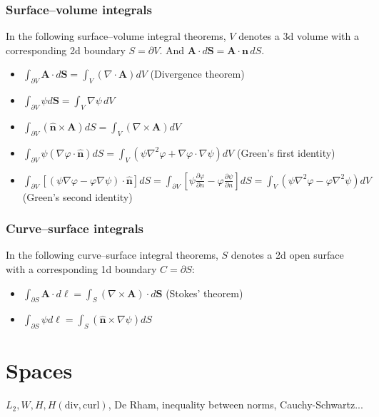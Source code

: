 \documentclass{article}
\begin{document}
\subsubsection{Surface–volume integrals}
In the following surface–volume integral theorems, $V$ denotes a 3d volume with
a corresponding 2d boundary $S = \partial V$. And
$\mathbf{A}\cdot d\mathbf{S}=\mathbf{A}\cdot\mathbf{n}\, dS$.
\begin{itemize}
\item
  $\int_{\partial V} \mathbf{A}\cdot d\mathbf{S}=
  \int_V \left(\nabla\cdot\mathbf{A}\right)dV$ (Divergence theorem)
\item
  $\int_{\partial V}\psi d \mathbf{S} = \int_V \nabla \psi\, dV$
\item
  $\int_{\partial V}\left(\hat{\mathbf{n}}\times\mathbf{A}\right)dS=
  \int _{V}\left(\nabla\times\mathbf{A}\right)dV$
\item
  $\int_{\partial V}\psi\left(\nabla\varphi\cdot\hat{\mathbf{n}}\right)dS =
  \int _{V}\left(\psi\nabla^{2}\varphi+\nabla\varphi\cdot\nabla\psi\right)dV$
  (Green's first identity)
\item
  $\int_{\partial V}\left[\left(\psi\nabla\varphi
  -\varphi\nabla\psi\right)\cdot\hat{\mathbf{n}}\right]dS=
  \int_{\partial V}\left[\psi\frac{\partial\varphi}{\partial n}
    -\varphi\frac{\partial\psi}{\partial n}\right]dS
  =\int_{V}\left(\psi\nabla^{2}\varphi-\varphi\nabla^{2}\psi\right)dV$
  (Green's second identity)
\end{itemize}

\subsubsection{Curve–surface integrals}
In the following curve–surface integral theorems, $S$ denotes a 2d open surface
with a corresponding 1d boundary $C = \partial S$:
\begin{itemize}
\item
  $\int_{\partial S}\mathbf{A}\cdot d\boldsymbol{\ell}=
  \int_{S}\left(\nabla\times\mathbf{A}\right)\cdot d\mathbf{S}$
  (Stokes' theorem)
\item
  $\int_{\partial S}\psi d\boldsymbol{\ell}
  =\int_{S}\left(\hat{\mathbf{n}}\times\nabla\psi\right)dS$
\end{itemize}

\section{Spaces}
$L_2,W,H,H(\mathrm{div,curl})$, De Rham, inequality between norms, Cauchy-Schwartz...
\end{document}
